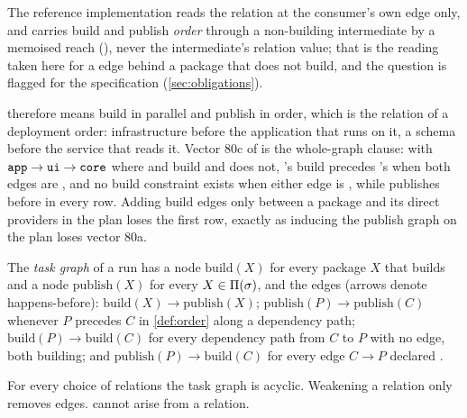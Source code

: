 The reference implementation reads the relation at the consumer's own edge
only, and carries build and publish \emph{order} through a non-building
intermediate by a memoised reach (), never the
intermediate's relation value; that is the reading taken here for a
 edge behind a package that does not build, and the question is
flagged for the specification (\cref{sec:obligations}).

 therefore means build in parallel and publish in order, which is
the relation of a deployment order: infrastructure before the application that
runs on it, a schema before the service that reads it. Vector 80c of
 is the whole-graph clause: with $\texttt{app} \to \texttt{ui} \to
\texttt{core}$ where  and  build and  does not,
's build precedes 's when both edges are , and
no build constraint exists when either edge is , while 
publishes before  in every row. Adding build edges only between a
package and its direct providers in the plan loses the first row, exactly as
inducing the publish graph on the plan loses vector 80a.

\begin{definition}
\label{def:taskgraph}
The \emph{task graph} of a run has a node $\mathrm{build}(X)$ for every package
$X$ that builds and a node $\mathrm{publish}(X)$ for every $X \in \Pi(\sigma)$,
and the edges (arrows denote happens-before): $\mathrm{build}(X) \to
\mathrm{publish}(X)$; $\mathrm{publish}(P) \to \mathrm{publish}(C)$ whenever
$P$ precedes $C$ in \cref{def:order} along a dependency path;
$\mathrm{build}(P) \to \mathrm{build}(C)$ for every dependency path from $C$ to
$P$ with no  edge, both building; and $\mathrm{publish}(P) \to
\mathrm{build}(C)$ for every edge $C \to P$ declared .
\end{definition}

\begin{proposition}
\label{prop:readiness-acyclic}
For every choice of relations the task graph is acyclic. Weakening a relation
only removes edges.  cannot arise from a relation.
\end{proposition}

